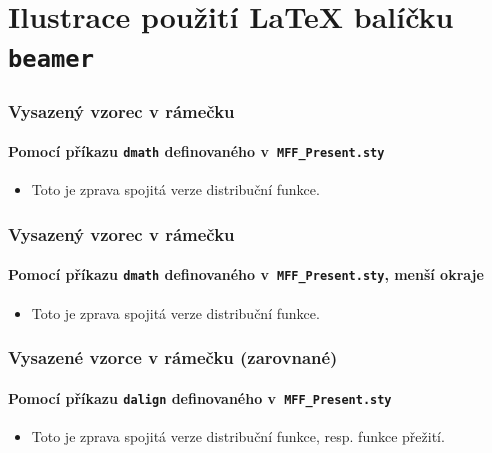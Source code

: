 \documentclass[c, 10pt]{beamer}
\begin{document}
\section{Ilustrace použití {\LaTeX} balíčku \texttt{beamer}}
\framesection{}

\begin{frame}\frametitle{Vysazený vzorec v rámečku}
\framesubtitle{Pomocí příkazu \texttt{dmath} definovaného v~\texttt{MFF\_{}Present.sty}}

\begin{itemize}
\item Toto je \alert{zprava} spojitá verze distribuční funkce.
\end{itemize}
\end{frame}

\begin{frame}\frametitle{Vysazený vzorec v rámečku}
\framesubtitle{Pomocí příkazu \texttt{dmath} definovaného v~\texttt{MFF\_{}Present.sty}, menší okraje}

\begin{itemize}
\item Toto je \alert{zprava} spojitá verze distribuční funkce.
\end{itemize}
\end{frame}

\begin{frame}\frametitle{Vysazené vzorce v rámečku (zarovnané)}
\framesubtitle{Pomocí příkazu \texttt{dalign} definovaného v~\texttt{MFF\_{}Present.sty}}

\begin{itemize}
\item Toto je \alert{zprava} spojitá verze distribuční funkce,
  resp. funkce přežití.
\end{itemize}
\end{frame}
\end{document}
